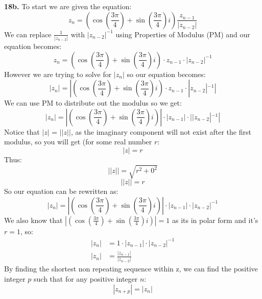 \documentclass[11pt]{article}
\begin{document}
\textbf{18b.} To start we are given the equation:
\[ z_n = (\cos(\frac{3\pi}{4}) + \sin(\frac{3\pi}{4})i)\frac{z_{n-1}}{|z_{n-2}|} \]
We can replace $\frac{1}{|z_{n-2}|}$ with $|z_{n-2}|^{-1}$ using Properties of Modulus (PM) and our equation becomes:
\[ z_n = (\cos(\frac{3\pi}{4}) + \sin(\frac{3\pi}{4})i) \cdot z_{n-1} \cdot |z_{n-2}|^{-1} \]
However we are trying to solve for $|z_n|$ so our equation becomes:
\[ |z_n| = |(\cos(\frac{3\pi}{4}) + \sin(\frac{3\pi}{4})i) \cdot z_{n-1} \cdot |z_{n-2}|^{-1}| \]
We can use PM to distribute out the modulus so we get:
\[ |z_n| = |(\cos(\frac{3\pi}{4}) + \sin(\frac{3\pi}{4})i)| \cdot |z_{n-1}| \cdot | |z_{n-2}|^{-1}| \]
Notice that $|z|$ = $||z||$, as the imaginary component will not exist after the first modulus, so you will get (for some real number $r$:
\[ |z| = r \]
Thus:
\[ ||z|| = \sqrt{r^2 + 0^2} \]
\[ ||z|| = r \]
So our equation can be rewritten as:
\[ |z_n| = |(\cos(\frac{3\pi}{4}) + \sin(\frac{3\pi}{4})i)| \cdot |z_{n-1}| \cdot |z_{n-2}|^{-1} \]
We also know that $|(\cos(\frac{3\pi}{4}) + \sin(\frac{3\pi}{4})i)| = 1$ as its in polar form and it's $r = 1$, so:
\begin{align*}
 |z_n| &= 1 \cdot |z_{n-1}| \cdot |z_{n-2}|^{-1}  \\
|z_n| &= \frac {|z_{n-1}|}{|z_{n-2}|}  
\end{align*}
By finding the shortest non repeating sequence within z, we can find the positive integer $p$ such that for any positive integer $n$:
\[ |z_{n+p}| = |z_n| \]
\end{document}
